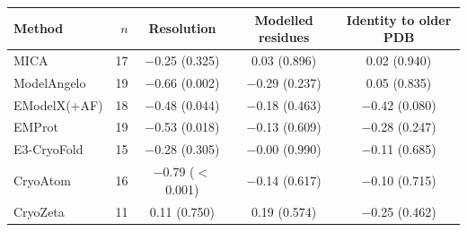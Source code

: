 \begin{tabular}{lrccc}
\toprule
Method & $n$ & Resolution & Modelled residues & Identity to older PDB \\
\midrule
MICA & 17 & $-$0.25 (0.325) & 0.03 (0.896) & 0.02 (0.940) \\
ModelAngelo & 19 & $-$0.66 (0.002) & $-$0.29 (0.237) & 0.05 (0.835) \\
EModelX(+AF) & 18 & $-$0.48 (0.044) & $-$0.18 (0.463) & $-$0.42 (0.080) \\
EMProt & 19 & $-$0.53 (0.018) & $-$0.13 (0.609) & $-$0.28 (0.247) \\
E3-CryoFold & 15 & $-$0.28 (0.305) & $-$0.00 (0.990) & $-$0.11 (0.685) \\
CryoAtom & 16 & $-$0.79 ($<$0.001) & $-$0.14 (0.617) & $-$0.10 (0.715) \\
CryoZeta & 11 & 0.11 (0.750) & 0.19 (0.574) & $-$0.25 (0.462) \\
\bottomrule
\end{tabular}

